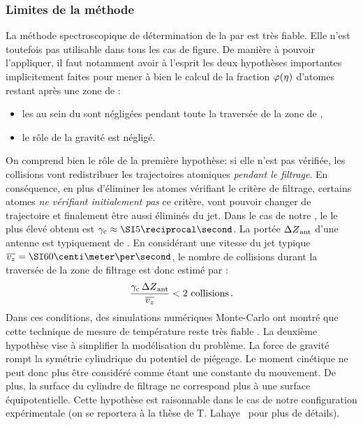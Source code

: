 		\subsubsection{Limites de la méthode}
	La méthode spectroscopique de détermination de la \tempt par \firf est très fiable. Elle n'est toutefois pas utilisable dans tous les cas de figure. De manière à pouvoir l'appliquer, il faut notamment avoir à l'esprit les deux hypothèses importantes implicitement faites pour mener à bien le calcul de la fraction ${\varphi}(\eta)$ d'atomes restant après une zone de \firf:
	\begin{itemize}
	\item les \colels au sein du \jat sont négligées pendant toute la traversée de la zone de \firf,
	\item le rôle de la gravité est négligé.
\end{itemize}	
On comprend bien le rôle de la première hypothèse: si elle n'est pas vérifiée, les collisions vont redistribuer les trajectoires atomiques \emph{pendant le filtrage}. En conséquence, en plus d'éliminer les atomes vérifiant le critère de filtrage, certains atomes \emph{ne vérifiant initialement pas} ce critère, vont pouvoir changer de trajectoire et finalement être aussi éliminés du jet.
\ApplicationNumerique
{Dans le cas de notre \jat, le \tcolel le plus élevé obtenu est $\gammacol \approx \smun{5}$. La portée ${{\Delta Z}_{\rm ant}}$ d'une antenne \rf est typiquement de . En considérant une vitesse du jet typique $\vjet = \cmps{60}$, le nombre de collisions durant la traversée de la zone de filtrage est donc estimé par :
\[
 \frac{{\gamma_{\rm c}} \, {{\Delta Z}_{\rm ant}}}{{\overline{v_z}}} < 2 \mbox{ collisions}
 \, .
 \]
Dans ces conditions, des simulations numériques Monte-Carlo ont montré que cette technique de mesure de température reste très fiable%
\footnotemark.
}
La deuxième hypothèse vise à simplifier la modélisation du problème. La force de gravité rompt la symétrie cylindrique du potentiel de piégeage. Le moment cinétique ne peut donc plus être considéré comme étant une constante du mouvement. De plus, la surface du cylindre de filtrage ne correspond plus à une surface équipotentielle. Cette hypothèse est raisonnable dans le cas de notre configuration expérimentale (on se reportera à la thèse de T. Lahaye~\cite{TTL} pour plus de détails).




